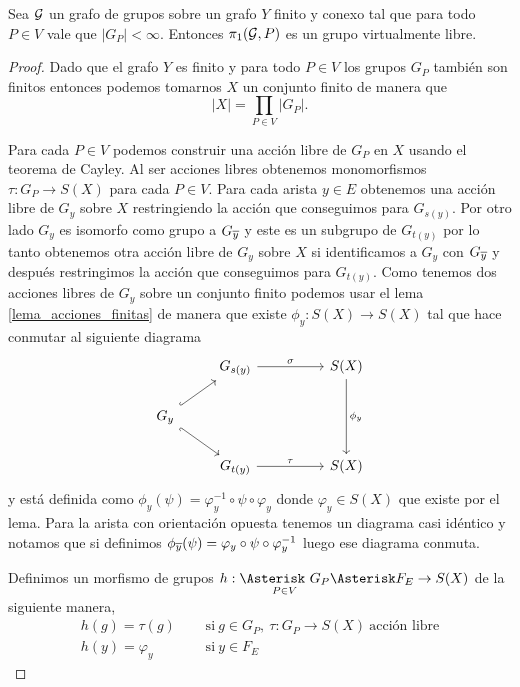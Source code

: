 \documentclass[tesis.tex]{subfiles}
\begin{document}
\begin{teo}\cite{karrass1973finite}\label{teo_karrass_solitar}
	Sea $\cal G$ un grafo de grupos sobre un grafo $Y$ finito y conexo tal que para todo $P \in V$ vale que $|G_{P}| < \infty$.
	Entonces $\pi_1({\cal G}, P)$ es un grupo virtualmente libre.
\end{teo}
\begin{proof}
	Dado que el grafo $Y$ es finito y para todo $P \in V$ los grupos $G_P$ también son finitos entonces podemos tomarnos $X$ un conjunto finito de manera que
	\[
		|X| = \prod_{P \in V} |G_P|.
	\] 
	
	Para cada $P \in V$ podemos construir una acción libre de $G_P$ en $X$ usando el teorema de Cayley.
	Al ser acciones libres obtenemos monomorfismos $\tau: G_P \to S(X)$ para cada $P \in V$.
	Para cada arista $y \in E$ obtenemos una acción libre de $G_{y}$ sobre $X$ restringiendo la acción que conseguimos para $G_{s(y)}$.
	Por otro lado $G_{y}$ es isomorfo como grupo a $G_{\overline y}$ y este es un subgrupo de $G_{t(y)}$ por lo tanto obtenemos otra acción libre de $G_{y}$ sobre $X$ si identificamos a $G_{y}$ con $G_{\overline y}$ y después restringimos la acción que conseguimos para $G_{t(y)}$.
	Como tenemos dos acciones libres de $G_{y}$ sobre un conjunto finito podemos usar el lema \ref{lema_acciones_finitas} de manera que existe $\phi_y: S(X) \to S(X)$ tal que hace conmutar al siguiente diagrama
	\[\begin{tikzcd}
		& {G_{s(y)}} && {S(X)} \\
		{G_y} \\
		& {G_{t(y)}} && {S(X)}
		\arrow["\sigma", from=1-2, to=1-4]
		\arrow["\tau", from=3-2, to=3-4]
		\arrow[hook, from=2-1, to=1-2]
		\arrow[hook', from=2-1, to=3-2]
		\arrow["\phi_y", from=1-4, to=3-4]
	\end{tikzcd}\]
	y está definida como $\phi_{y}(\psi) = \varphi_{y}^{-1} \circ \psi \circ \varphi_{y}$ donde $\varphi_{y} \in S(X)$ que existe por el lema.
	Para la arista con orientación opuesta tenemos un diagrama casi idéntico y notamos que si definimos $\phi_{\overline y}(\psi) = \varphi_{y} \circ \psi \circ \varphi_{y}^{-1}$ luego ese diagrama conmuta.
	
	Definimos un morfismo de grupos $h: \underset{P \in V}{\Asterisk \ G_{P}} \Asterisk F_{E} \to S(X)$ de la siguiente manera,
	\begin{align*}
		 h(g) = \tau(g) & \ \ \  \ \ \  \text{si} \ g \in G_{P}, \ \tau:G_{P} \to S(X) \ \text{acción libre} \\
		h(y) = \varphi_{y} & \ \ \ \ \ \ \text{si} \ y \in F_{E}
	\end{align*}
	

\end{proof}
\end{document}
